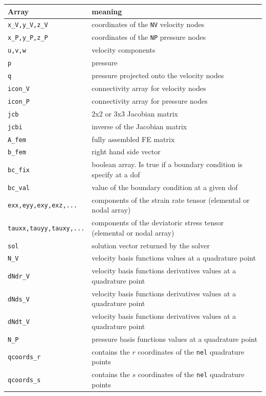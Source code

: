 \documentclass[a4paper,11pt]{report}
\begin{document}
\vspace{.5cm}

\begin{tabular}{p{3.5cm}p{12.5cm}}
\hline
Array & meaning \\
\hline
\hline
{\tt x\_V,y\_V,z\_V} & coordinates of the {\tt NV} velocity nodes \\
{\tt x\_P,y\_P,z\_P} & coordinates of the {\tt NP} pressure nodes \\
{\tt u,v,w} & velocity components \\ 
{\tt p} & pressure \\ 
{\tt q} & pressure projected onto the velocity nodes\\
{\tt icon\_V} & connectivity array for velocity nodes \\
{\tt icon\_P} & connectivity array for pressure nodes \\
{\tt jcb} & 2x2 or 3x3 Jacobian matrix \\
{\tt jcbi} & inverse of the Jacobian matrix \\
{\tt A\_fem}  & fully assembled FE matrix \\
{\tt b\_fem} & right hand side vector \\
{\tt bc\_fix} & boolean array. Is true if a boundary condition is specify at a dof \\
{\tt bc\_val} & value of the boundary condition at a given dof \\
{\tt exx,eyy,exy,exz,...} & components of the strain rate tensor (elemental or nodal array)\\
{\tt tauxx,tauyy,tauxy,...} & components of the deviatoric stress tensor (elemental or nodal array)\\
{\tt sol} & solution vector returned by the solver\\
{\tt N\_V} & velocity basis functions values at a quadrature point \\
{\tt dNdr\_V} &velocity basis functions derivatives values at a quadrature point \\
{\tt dNds\_V} &velocity basis functions derivatives values at a quadrature point \\
{\tt dNdt\_V} &velocity basis functions derivatives values at a quadrature point \\
{\tt N\_P} & pressure basis functions values at a quadrature point \\
\hline
{\tt qcoords\_r} & contains the $r$ coordinates of the {\tt nel} quadrature points \\
{\tt qcoords\_s} & contains the $s$ coordinates of the {\tt nel} quadrature points \\

\end{tabular}
\end{document}
